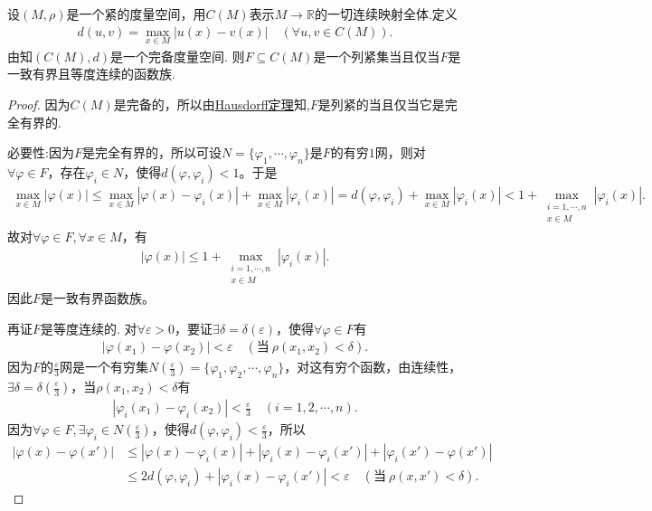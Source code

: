 \documentclass[../../main.tex]{subfiles}%
\begin{document}
\begin{theorem}\label{theorem:泛函分析--Arzelà-Ascoli定理}
设$(M,\rho)$是一个紧的度量空间，用$C(M)$表示$M\to\mathbb{R}$的一切连续映射全体.定义
\begin{align*}
d(u,v)=\max\limits_{x\in M}|u(x)-v(x)|\quad (\forall u,v\in C(M)).
\end{align*}
由知$(C(M),d)$是一个完备度量空间.
则$F\subseteq C(M)$是一个列紧集当且仅当$F$是一致有界且等度连续的函数族.
\end{theorem}
\begin{proof}

因为$C(M)$是完备的，所以由\hyperref[theorem:泛函分析--Hausdorff定理]{Hausdorff定理}知,$F$是列紧的当且仅当它是完全有界的.

{\heiti 必要性:}因为$F$是完全有界的，所以可设$N=\{\varphi_1,\cdots,\varphi_n\}$是$F$的有穷$1$网，则对$\forall \varphi \in F$，存在$\varphi_i\in N$，使得$d(\varphi,\varphi_i)<1$。于是
\begin{align*}
\max\limits_{x\in M}|\varphi(x)|\leqslant\max\limits_{x\in M}|\varphi(x)-\varphi_i(x)|+\max\limits_{x\in M}|\varphi_i(x)|=d(\varphi,\varphi_i)+\max\limits_{x\in M}|\varphi_i(x)|<1+\max\limits_{\substack{i=1,\cdots,n\\x\in M}} |\varphi_i(x)|.
\end{align*}
故对$\forall \varphi \in F,\forall x\in M$，有
\begin{align*}
|\varphi(x)|\leqslant 1+\max\limits_{\substack{i=1,\cdots,n\\x\in M}} |\varphi_i(x)|.
\end{align*}
因此$F$是一致有界函数族。

再证$F$是等度连续的.
对$\forall\varepsilon>0$，要证$\exists\delta=\delta(\varepsilon)$，使得$\forall\varphi\in F$有
\begin{align*}
|\varphi(x_1)-\varphi(x_2)|<\varepsilon\quad (\text{当}\ \rho(x_1,x_2)<\delta).
\end{align*}
因为$F$的$\frac{\varepsilon}{3}$网是一个有穷集$N(\frac{\varepsilon}{3})=\{\varphi_1,\varphi_2,\cdots,\varphi_n\}$，对这有穷个函数，由连续性，$\exists\delta=\delta(\frac{\varepsilon}{3})$，当$\rho(x_1,x_2)<\delta$有
\begin{align*}
|\varphi_i(x_1)-\varphi_i(x_2)|<\frac{\varepsilon}{3}\quad (i=1,2,\cdots,n).
\end{align*}
因为$\forall\varphi\in F,\exists\varphi_i\in N(\frac{\varepsilon}{3})$，使得$d(\varphi,\varphi_i)<\frac{\varepsilon}{3}$，所以
\begin{align*}
|\varphi(x)-\varphi(x')|&\leqslant|\varphi(x)-\varphi_i(x)|+|\varphi_i(x)-\varphi_i(x')|+|\varphi_i(x')-\varphi(x')| \\
&\leqslant 2d(\varphi,\varphi_i)+|\varphi_i(x)-\varphi_i(x')|<\varepsilon\quad (\text{当}\ \rho(x,x')<\delta).
\end{align*}


\end{proof}
\end{document}
